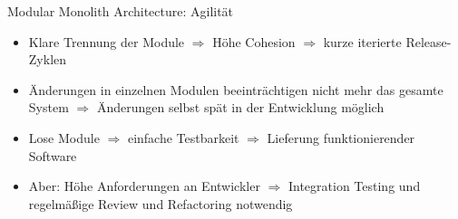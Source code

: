 \begin{frame}{Modular Monolith Architecture: Agilität}
    \begin{itemize}
      \item Klare Trennung der Module $\Rightarrow$ Höhe Cohesion $\Rightarrow$ kurze iterierte Release-Zyklen
      \item Änderungen in einzelnen Modulen beeinträchtigen nicht mehr das gesamte System $\Rightarrow$ Änderungen selbst spät in der Entwicklung möglich
      \item Lose Module $\Rightarrow$ einfache Testbarkeit $\Rightarrow$ Lieferung funktionierender Software
      \item Aber: Höhe Anforderungen an Entwickler $\Rightarrow$ Integration Testing und regelmäßige Review und Refactoring notwendig
    \end{itemize}
\end{frame}
